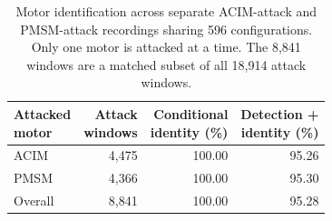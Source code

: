\begin{table}[!t]
\centering
\caption{Motor identification across separate ACIM-attack and PMSM-attack recordings sharing 596 configurations. Only one motor is attacked at a time. The 8,841 windows are a matched subset of all 18,914 attack windows.}
\label{tab:matched_motor_settings}
\small
\setlength{\tabcolsep}{4pt}
\begin{tabular}{lrrr}
\toprule
\shortstack{Attacked\\motor} & \shortstack{Attack\\windows} & \shortstack{Conditional\\identity (\%)} & \shortstack{Detection +\\identity (\%)} \\
\midrule
ACIM & 4,475 & 100.00 & 95.26 \\
PMSM & 4,366 & 100.00 & 95.30 \\
Overall & 8,841 & 100.00 & 95.28 \\
\bottomrule
\end{tabular}
\end{table}
